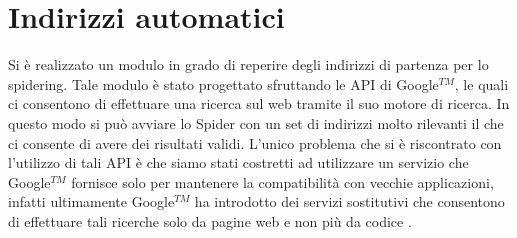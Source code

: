 \section{Indirizzi automatici}\label{cap:spider:roots}
Si è realizzato un modulo in grado di reperire degli indirizzi di partenza per lo spidering. Tale modulo è stato progettato sfruttando le API di Google$^{TM}$, le quali ci consentono di effettuare una ricerca sul web tramite il suo motore di ricerca. In questo modo si può avviare lo Spider con un set di indirizzi molto rilevanti il che ci consente di avere dei risultati validi. L'unico problema che si è riscontrato con l'utilizzo di tali API è che siamo stati costretti ad utilizzare un servizio che Google$^{TM}$ fornisce solo per mantenere la compatibilità con vecchie applicazioni, infatti ultimamente Google$^{TM}$ ha introdotto dei servizi sostitutivi che consentono di effettuare tali ricerche solo da pagine web e non più da codice .